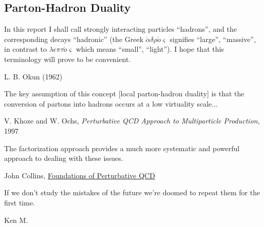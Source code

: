 \subsection{Parton-Hadron Duality}
\label{sec:phd}

\epigraph{
In this report I shall call strongly interacting particles ``hadrons'', and the corresponding decays ``hadronic'' (the Greek \(\acute{\alpha}\delta \rho \acute{o}\varsigma\) signifies ``large'', ``massive'', in contrast to \(\lambda \epsilon \pi \tau \acute{o} \varsigma\) which means ``small'', ``light''). I hope that this terminology will prove to be convenient.}{L. B. Okun (1962)}

\vspace{-15pt}

\epigraph{
    The key assumption of this concept [local parton-hadron duality] is that the conversion of partons into hadrons occurs at a low virtuality scale...
}
{V. Khoze and W. Ochs, \textit{Perturbative QCD Approach to Multiparticle Production}, 1997 \cite{Khoze:1996dn}}

\vspace{-15pt}


\epigraph{The factorization approach provides a much more systematic and powerful approach to dealing with these issues.}{John Collins, \underline{Foundations of Perturbative QCD} \cite{Collins:2011zzd}}


\vspace{-15pt}


\epigraph{If we don't study the mistakes of the future we're doomed to repeat them for the first time.}{Ken M.}



\iffalse
\epigraph{
    A short time scale, of the order of the inverse of the large momenta in the process, characterizes the hard collisions of the constituents.
    A long time scale, of the order of the typical hadron radius, characterizes the binding and recombination of the constituents.
    The short time scale physics depends on the process, but is calculable.
    The long time scale physics contains all the complexity of the bound state problem, but it is independent of the process.
}
{
        \textit{Perturbation Theory and the Parton Model in QCD} (1978),
    R.K Ellis, H. Georgi, M. Machacek, H.D. Politzer, G.G. Ross
}
\fi



